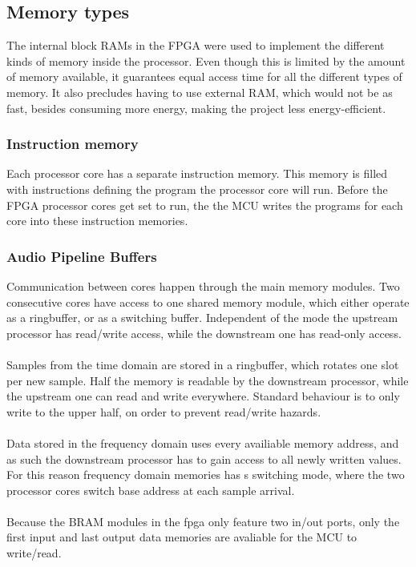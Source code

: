 \subsection{Memory types}\label{subsec:fpga-memory}

The internal block RAMs in the FPGA were used to implement the different kinds
of memory inside the processor. Even though this is limited by the amount of
memory available, it guarantees equal access time for all the different types
of memory. It also precludes having to use external RAM, which would not be as
fast, besides consuming more energy, making the project less energy-efficient.

\subsubsection{Instruction memory}

Each processor core has a separate instruction memory. This memory is filled
with instructions defining the program the processor core will run. Before the
FPGA processor cores get set to run, the the MCU writes the programs for each
core into these instruction memories.

\subsubsection{Audio Pipeline Buffers}
Communication between cores happen through the main memory modules. Two
consecutive cores have access to one shared memory module, which either operate
as a ringbuffer, or as a switching buffer. Independent of the mode the upstream
processor has read/write access, while the downstream one has read-only access.\\
\\
Samples from the time domain are stored in a ringbuffer, which rotates one slot
per new sample. Half the memory is readable by the downstream processor, while
the upstream one can read and write everywhere. Standard behaviour is to only
write to the upper half, on order to prevent read/write hazards.\\ 
\\
Data stored in the frequency domain uses every availiable memory address, and as
such the downstream processor has to gain access to all newly written values.
For this reason frequency domain memories has s switching mode, where the two
processor cores switch base address at each sample arrival.\\
\\
Because the BRAM modules in the fpga only feature two in/out ports, only the
first input and last output data memories are avaliable for the MCU to 
write/read.

